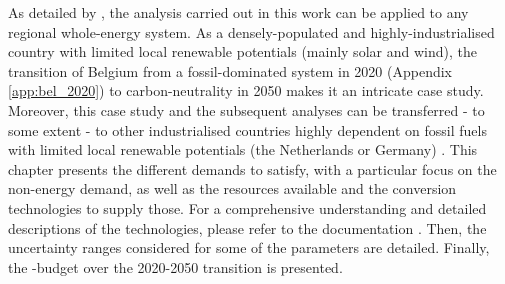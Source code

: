 
%
%
%

As detailed by \citet{limpens2024pathway}, the analysis carried out in this work can be applied to any regional whole-energy system. As a densely-populated and highly-industrialised country with limited local renewable potentials (mainly solar and wind), the transition of Belgium from a fossil-dominated system in 2020 (Appendix \ref{app:bel_2020}) to carbon-neutrality in 2050 makes it an intricate case study. Moreover, this case study and the subsequent analyses can be transferred - to some extent - to other industrialised countries highly dependent on fossil fuels with limited local renewable potentials (\eg the Netherlands or Germany) \cite{dommisse2020modelling}. This chapter presents the different demands to satisfy, with a particular focus on the non-energy demand, as well as the resources available and the conversion technologies to supply those. For a comprehensive understanding and detailed descriptions of the technologies, please refer to the documentation \cite{readthedocs_pathway}. Then, the uncertainty ranges considered for some of the parameters are detailed. Finally, the -budget over the 2020-2050 transition is presented.

